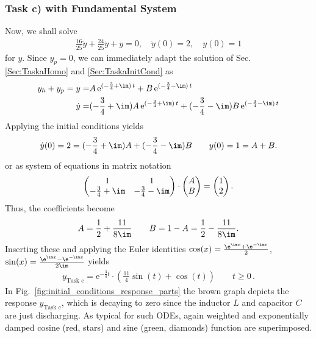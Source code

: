 \subsubsection{Task c) with Fundamental System}
Now, we shall solve
\begin{align}
\frac{16}{25} \ddot{y} + \frac{24}{25} \dot{y} + y = 0,
\quad \dot{y}(0) = 2,\quad y(0)=1
\end{align}
for $y$.
%
Since $y_p=0$, we can immediately adapt the solution of Sec.
\ref{Sec:TaskaHomo} and \ref{Sec:TaskaInitCond} as
%
\begin{align}
y_h + y_p = y =& A \, \mathrm{e}^{(-\frac{3}{4}+\im)\,t} + B \, \mathrm{e}^{(-\frac{3}{4}-\im)\,t}\\
\dot{y} =&
(-\frac{3}{4}+\im) A \, \mathrm{e}^{(-\frac{3}{4}+\im)\,t} +
(-\frac{3}{4}-\im) B \, \mathrm{e}^{(-\frac{3}{4}-\im)\,t}
\end{align}
%
Applying the initial conditions yields
%
\begin{align}
\dot{y}(0) = 2 =
(-\frac{3}{4}+\im) A+
(-\frac{3}{4}-\im) B
\qquad
y(0) = 1 = A + B.
\end{align}
or as system of equations in matrix notation
\begin{align}
	\begin{pmatrix}
		1 & 1 \\
		-\frac{3}{4}+\im & -\frac{3}{4}-\im
	\end{pmatrix}
	\cdot
	\begin{pmatrix}
		A \\
		B
	\end{pmatrix} =
	\begin{pmatrix}
		1 \\
		2
	\end{pmatrix}. \nonumber
\end{align}
Thus, the coefficients become
\begin{align}
A = \frac{1}{2} + \frac{11}{8\im}\qquad B = 1-A = \frac{1}{2} - \frac{11}{8\im}.
\end{align}
%
Inserting these and applying the Euler identities
$\cos(x) = \frac{\e^{\im x}+\e^{-\im x}}{2}$,
$\sin(x) = \frac{\e^{\im x}-\e^{-\im x}}{2\im}$
yields
\begin{align}
\boxed{
y_\text{Task c} = \mathrm{e}^{-\frac{3}{4} t} \cdot
\left( \frac{11}{4} \sin(t) + \cos(t)\right) \qquad t\geq 0
}\,.
\end{align}
In Fig.~\ref{fig:initial_conditions_response_parts} the brown graph depicts the
response $y_\text{Task c}$, which is decaying to zero since the inductor $L$ and capacitor $C$ are
just discharging. As typical for such ODEs, again
weighted and exponentially damped cosine (red, stars) and sine (green, diamonds)
function are superimposed.

